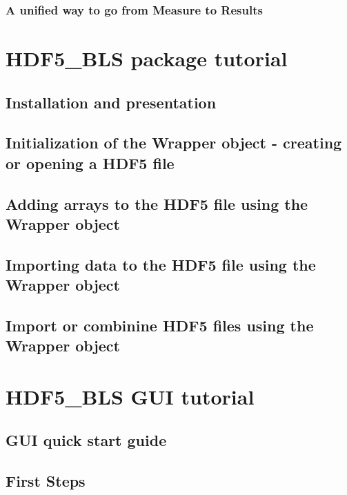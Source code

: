 \documentclass{book}
\newcommand{\mypart}[1]{\setcounter{chapter}{0} \part{#1}}
\begin{document}
    \section*{A unified way to go from Measure to Results}
        


\mypart{HDF5\_BLS package tutorial}\label{chapter:tutorial}
    \chapter*{Installation and presentation}
        
        
    \chapter{Initialization of the Wrapper object - creating or opening a HDF5 file}
        

    \chapter{Adding arrays to the HDF5 file using the Wrapper object}
        

    \chapter{Importing data to the HDF5 file using the Wrapper object}
        

    \chapter{Import or combinine HDF5 files using the Wrapper object}
        


\mypart{HDF5\_BLS GUI tutorial}
    \chapter{GUI quick start guide}
        

    \chapter{First Steps}
\end{document}
